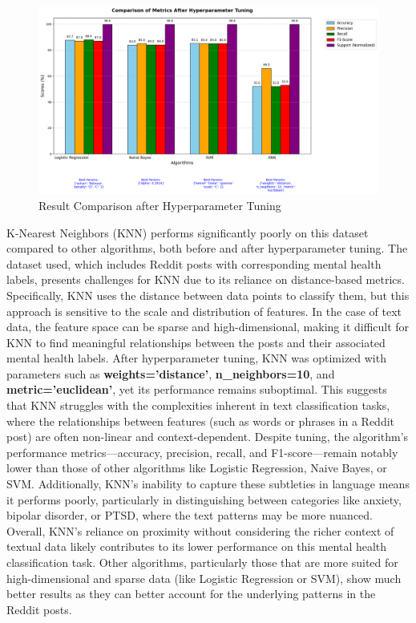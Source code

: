 \begin{figure}[h!]  
    \centering
    \includegraphics[width=1.0\textwidth]{Images/ML GRAPH 2 HT.png}  
    \caption{Result Comparison after Hyperparameter Tuning}
    \label{dfdl123}  %
\end{figure}

\vspace{1em}

\noindent 
K-Nearest Neighbors (KNN) performs significantly poorly on this dataset compared to other algorithms, both before and after hyperparameter tuning. The dataset used, which includes Reddit posts with corresponding mental health labels, presents challenges for KNN due to its reliance on distance-based metrics. Specifically, KNN uses the distance between data points to classify them, but this approach is sensitive to the scale and distribution of features. In the case of text data, the feature space can be sparse and high-dimensional, making it difficult for KNN to find meaningful relationships between the posts and their associated mental health labels. After hyperparameter tuning, KNN was optimized with parameters such as \textbf{weights='distance'}, \textbf{n\_neighbors=10}, and \textbf{metric='euclidean'}, yet its performance remains suboptimal. This suggests that KNN struggles with the complexities inherent in text classification tasks, where the relationships between features (such as words or phrases in a Reddit post) are often non-linear and context-dependent. Despite tuning, the algorithm's performance metrics—accuracy, precision, recall, and F1-score—remain notably lower than those of other algorithms like Logistic Regression, Naive Bayes, or SVM. Additionally, KNN's inability to capture these subtleties in language means it performs poorly, particularly in distinguishing between categories like anxiety, bipolar disorder, or PTSD, where the text patterns may be more nuanced. Overall, KNN's reliance on proximity without considering the richer context of textual data likely contributes to its lower performance on this mental health classification task. Other algorithms, particularly those that are more suited for high-dimensional and sparse data (like Logistic Regression or SVM), show much better results as they can better account for the underlying patterns in the Reddit posts.



